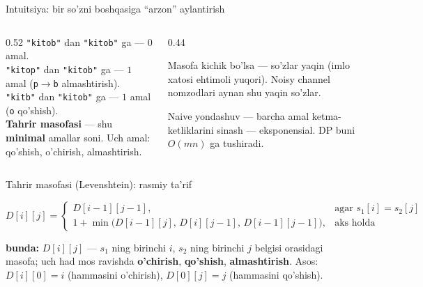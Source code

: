 \documentclass[aspectratio=169,11pt]{beamer}
\newcommand{\bunda}[1]{{\small\textbf{bunda:}\; #1}}
\begin{document}
\begin{frame}{Intuitsiya: bir so'zni boshqasiga ``arzon'' aylantirish}
  \begin{columns}[T]
    \begin{column}{0.52\textwidth}
      \small
      \texttt{"kitob"} dan \texttt{"kitob"} ga --- $0$ amal.\\[3pt]
      \texttt{"kitop"} dan \texttt{"kitob"} ga --- $1$ amal
      (\texttt{p}$\to$\texttt{b} almashtirish).\\[3pt]
      \texttt{"kitb"} dan \texttt{"kitob"} ga --- $1$ amal
      (\texttt{o} qo'shish).\\[6pt]
      \textbf{Tahrir masofasi} --- shu \textbf{minimal} amallar soni.
      Uch amal: qo'shish, o'chirish, almashtirish.
    \end{column}
    \begin{column}{0.44\textwidth}
      \begin{tcolorbox}[okbox,top=2pt,bottom=2pt]
        \footnotesize
        Masofa kichik bo'lsa --- so'zlar yaqin (imlo xatosi ehtimoli
        yuqori). Noisy channel nomzodlari aynan shu yaqin so'zlar.
      \end{tcolorbox}
      \vspace{4pt}
      \footnotesize\color{halfgray}
      Naive yondashuv --- barcha amal ketma-ketliklarini sinash ---
      eksponensial. DP buni $O(mn)$ ga tushiradi.
    \end{column}
  \end{columns}
\end{frame}

\begin{frame}{Tahrir masofasi (Levenshtein): rasmiy ta'rif}
  \begin{tcolorbox}[defbox,title=Ta'rif: DP rekurrensiyasi]
    \vspace{-0.3em}
    $$ D[i][j] =
       \begin{cases}
         D[i{-}1][j{-}1], & \text{agar } s_1[i]=s_2[j]\\[3pt]
         1 + \min\big(D[i{-}1][j],\, D[i][j{-}1],\, D[i{-}1][j{-}1]\big), & \text{aks holda}
       \end{cases} $$
  \end{tcolorbox}
  \vspace{2pt}
  \bunda{$D[i][j]$ --- $s_1$ ning birinchi $i$, $s_2$ ning birinchi $j$
  belgisi orasidagi masofa; uch had mos ravishda \textbf{o'chirish},
  \textbf{qo'shish}, \textbf{almashtirish}.}
  \vspace{3pt}
  \footnotesize Asos: $D[i][0]=i$ (hammasini o'chirish),
  $D[0][j]=j$ (hammasini qo'shish).
\end{frame}
\end{document}
